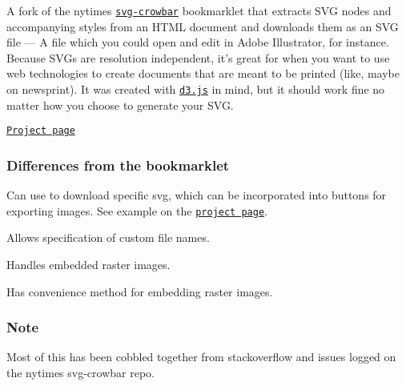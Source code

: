 A fork of the nytimes \href{http://nytimes.github.io/svg-crowbar/}{\tt svg-\/crowbar} bookmarklet that extracts S\+VG nodes and accompanying styles from an H\+T\+ML document and downloads them as an S\+VG file --- A file which you could open and edit in Adobe Illustrator, for instance. Because S\+V\+Gs are resolution independent, it’s great for when you want to use web technologies to create documents that are meant to be printed (like, maybe on newsprint). It was created with \href{https://d3js.org}{\tt d3.\+js} in mind, but it should work fine no matter how you choose to generate your S\+VG.

\href{http://edeno.github.com/d3-save-svg/}{\tt Project page}

\subsubsection*{Differences from the bookmarklet}


\begin{DoxyItemize}
\item Can use to download specific svg, which can be incorporated into buttons for exporting images. See example on the \href{http://edeno.github.com/d3-save-svg/}{\tt project page}.
\item Allows specification of custom file names.
\item Handles embedded raster images.
\item Has convenience method for embedding raster images.
\end{DoxyItemize}

\subsubsection*{Note}

Most of this has been cobbled together from stackoverflow and issues logged on the nytimes svg-\/crowbar repo. 